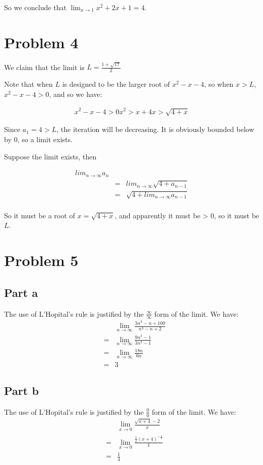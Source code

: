 \documentclass{article}
\begin{document}
So we conclude that $ \lim_{x \to 1} x^2 + 2x + 1 = 4 $.

\section*{Problem 4}

We claim that the limit is $ L = \frac{1 + \sqrt{17}}{2} $

Note that when $ L $ is designed to be the larger root of $ x^2 - x - 4 $, so when $ x > L $, $ x^2 - x - 4 > 0 $, and so we have:

\begin{eqnarray*}
x^2 - x - 4 > 0
x^2 > x + 4
x > \sqrt{4 + x}
\end{eqnarray*}

Since $ a_1 = 4 > L $, the iteration will be decreasing. It is obviously bounded below by 0, so a limit exists.

Suppose the limit exists, then 

\begin{eqnarray*}
      lim_{n \to \infty} a_n \\
  &=& lim_{n \to \infty} \sqrt{4 + a_{n-1}} \\
  &=& \sqrt{4 + lim_{n \to \infty} a_{n-1}} \\
\end{eqnarray*}

So it must be a root of $ x = \sqrt{4 + x} $, and apparently it must be > 0, so it must be $ L $.

\section*{Problem 5}
\subsection*{Part a}
The use of L'Hopital's rule is justified by the $ \frac{\infty}{\infty} $ form of the limit. We have:
\begin{eqnarray*}
  & & \lim_{n \to \infty}\frac{3n^3 - n + 100}{n^3 - n + 2} \\
  &=& \lim_{n \to \infty}\frac{9n^2 - 1}{3n^2 - 1} \\
  &=& \lim_{n \to \infty}\frac{18n}{6n} \\
  &=& 3 
\end{eqnarray*}

\subsection*{Part b}
The use of L'Hopital's rule is justified by the $ \frac{0}{0} $ form of the limit. We have:
\begin{eqnarray*}
  & & \lim_{x \to 0}\frac{\sqrt{x + 4} - 2}{x} \\
  &=& \lim_{x \to 0}\frac{\frac{1}{2}(x + 4)^{-\frac{1}{2}}}{1} \\
  &=& \frac{1}{4} 
\end{eqnarray*}
\end{document}
